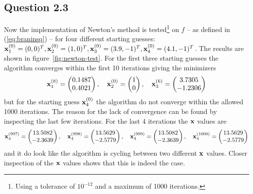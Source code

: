 \subsection*{Question 2.3}
Now the implementation of Newton's method is tested\footnote{Using a tolerance of $10^{-12}$ and a maximum of 1000 iterations.} on $f$ -- as defined in (\ref{eq:braninsq}) -- for four different starting guesses: $\mathbf{x}^{(0)}_{1}=(0,0)^T, \mathbf{x}^{(0)}_{2}=(1,0)^T, \mathbf{x}^{(0)}_{3}=(3.9, -1)^T, \mathbf{x}^{(0)}_{4}=(4.1, -1)^T$. The results are shown in figure~\ref{fig:newton-test}. For the first three starting guesses the algorithm converges within the first 10 iterations giving the minimizers
\begin{equation*}
    \mathbf{x}_1^{(8)} = \begin{pmatrix}
        0.1487 \\ 0.4021
    \end{pmatrix}, \quad
    \mathbf{x}_2^{(0)} = \begin{pmatrix}
        1 \\ 0
    \end{pmatrix}, \quad
    \mathbf{x}_3^{(6)} = \begin{pmatrix}
        3.7305 \\ -1.2306
    \end{pmatrix}
\end{equation*}
but for the starting guess $\mathbf{x}_4^{(0)}$ the algorithm do not converge within the allowed 1000 iterations. The reason for the lack of convergence can be found by inspecting the last few iterations. For the last 4 iterations the $\mathbf{x}$ values are
\begin{equation*}
    \mathbf{x}_4^{(997)} = \begin{pmatrix}
        13.5082 \\ -2.3639
    \end{pmatrix}, \quad 
    \mathbf{x}_4^{(998)} = \begin{pmatrix}
        13.5629 \\ -2.5779
    \end{pmatrix}, \quad 
    \mathbf{x}_4^{(999)} = \begin{pmatrix}
        13.5082 \\ -2.3639
    \end{pmatrix}, \quad 
    \mathbf{x}_4^{(1000)} = \begin{pmatrix}
        13.5629 \\ -2.5779
    \end{pmatrix}
\end{equation*}
and it do look like the algorithm is cycling between two different $\mathbf{x}$ values. Closer inspection of the $\mathbf{x}$ values shows that this is indeed the case. \par
